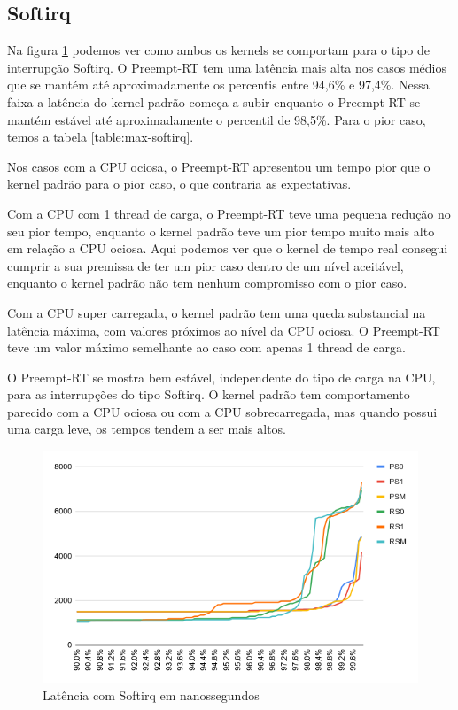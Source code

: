 \subsection{Softirq}

Na figura \ref{grafico:softirq} podemos ver como ambos os kernels se comportam para o tipo de interrupção Softirq. O Preempt-RT tem uma latência mais alta nos casos médios que se mantém até aproximadamente os percentis entre 94,6\% e 97,4\%. Nessa faixa a latência do kernel padrão começa a subir enquanto o Preempt-RT se mantém estável até aproximadamente o percentil de 98,5\%. Para o pior caso, temos a tabela \ref{table:max-softirq}.

Nos casos com a CPU ociosa, o Preempt-RT apresentou um tempo pior que o kernel padrão para o pior caso, o que contraria as expectativas.

Com a CPU com 1 thread de carga, o Preempt-RT teve uma pequena redução no seu pior tempo, enquanto o kernel padrão teve um pior tempo muito mais alto em relação a CPU ociosa. Aqui podemos ver que o kernel de tempo real consegui cumprir a sua premissa de ter um pior caso dentro de um nível aceitável, enquanto o kernel padrão não tem nenhum compromisso com o pior caso.

Com a CPU super carregada, o kernel padrão tem uma queda substancial na latência máxima, com valores próximos ao nível da CPU ociosa. O Preempt-RT teve um valor máximo semelhante ao caso com apenas 1 thread de carga.

O Preempt-RT se mostra bem estável, independente do tipo de carga na CPU, para as interrupções do tipo Softirq. O kernel padrão tem comportamento parecido com a CPU ociosa ou com a CPU sobrecarregada, mas quando possui uma carga leve, os tempos tendem a ser mais altos.

\begin{figure}[H]
  \centering
        \includegraphics[width=\textwidth]{graficos/softirq.png}
        \caption{Latência com Softirq em nanossegundos}
        \label{grafico:softirq}
\end{figure}

